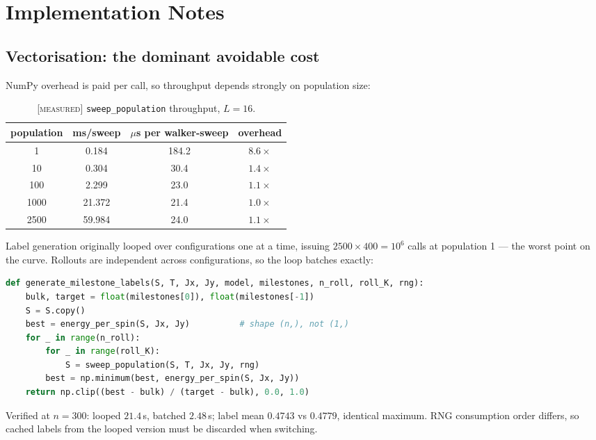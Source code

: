 \documentclass[11pt,a4paper]{article}
\newcommand{\MEAS}{\textcolor{blue!60!black}{\footnotesize[\textsc{measured}]}}
\begin{document}
\section{Implementation Notes}

\subsection{Vectorisation: the dominant avoidable cost}
NumPy overhead is paid per call, so throughput depends strongly on population size:

\begin{table}[H]\centering\small
\caption{\MEAS{} \texttt{sweep\_population} throughput, $L=16$.}
\begin{tabular}{cccc}\toprule
population & ms/sweep & $\mu$s per walker-sweep & overhead\\\midrule
1 & 0.184 & 184.2 & $8.6\times$\\
10 & 0.304 & 30.4 & $1.4\times$\\
100 & 2.299 & 23.0 & $1.1\times$\\
1000 & 21.372 & 21.4 & $1.0\times$\\
2500 & 59.984 & 24.0 & $1.1\times$\\
\bottomrule\end{tabular}
\end{table}

Label generation originally looped over configurations one at a time, issuing
$2500\times400=10^6$ calls at population 1 --- the worst point on the curve. Rollouts are
independent across configurations, so the loop batches exactly:

\begin{lstlisting}[language=Python,caption={Batched label generation: measured 8.6$\times$ faster, statistically identical output.}]
def generate_milestone_labels(S, T, Jx, Jy, model, milestones, n_roll, roll_K, rng):
    bulk, target = float(milestones[0]), float(milestones[-1])
    S = S.copy()
    best = energy_per_spin(S, Jx, Jy)          # shape (n,), not (1,)
    for _ in range(n_roll):
        for _ in range(roll_K):
            S = sweep_population(S, T, Jx, Jy, rng)
        best = np.minimum(best, energy_per_spin(S, Jx, Jy))
    return np.clip((best - bulk) / (target - bulk), 0.0, 1.0)
\end{lstlisting}

Verified at $n=300$: looped $21.4$\,s, batched $2.48$\,s; label mean $0.4743$ vs $0.4779$,
identical maximum. RNG consumption order differs, so cached labels from the looped version must
be discarded when switching.
\end{document}

